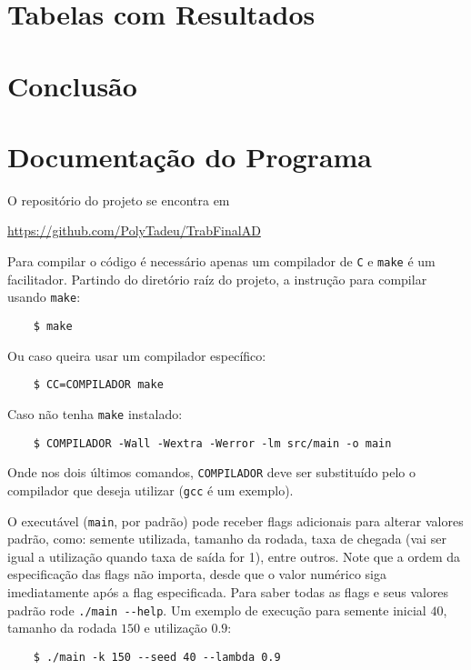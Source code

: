 \documentclass[a4paper]{article}
\newcommand{\inlcode}{\texttt}
\newcommand{\lang}{\texttt}
\begin{document}
\newpage
\section{Tabelas com Resultados}
\section{Conclusão}
\newpage
\section{Documentação do Programa}
O repositório do projeto se encontra em \par
\url{https://github.com/PolyTadeu/TrabFinalAD}

Para compilar o código é necessário apenas
um compilador de \lang{C}
e \inlcode{make} é um facilitador.
Partindo do diretório raíz do projeto,
a instrução para compilar usando \inlcode{make}:
\begin{verbatim}
    $ make
\end{verbatim}
Ou caso queira usar um compilador específico:
\begin{verbatim}
    $ CC=COMPILADOR make
\end{verbatim}
Caso não tenha \inlcode{make} instalado:
\begin{verbatim}
    $ COMPILADOR -Wall -Wextra -Werror -lm src/main -o main
\end{verbatim}
Onde nos dois últimos comandos,
\verb.COMPILADOR. deve ser substituído
pelo o compilador que deseja utilizar
(\inlcode{gcc} é um exemplo).

O executável (\inlcode{main}, por padrão)
pode receber flags adicionais para alterar valores padrão,
como: semente utilizada, tamanho da rodada,
taxa de chegada
(vai ser igual a utilização quando taxa de saída for 1),
entre outros.
Note que a ordem da especificação das flags não importa,
desde que o valor numérico siga imediatamente após
a flag especificada.
Para saber todas as flags e seus valores padrão
rode \inlcode{./main -{}-help}.
Um exemplo de execução para semente inicial \(40\),
tamanho da rodada \(150\) e utilização \(0.9\):
\begin{verbatim}
    $ ./main -k 150 --seed 40 --lambda 0.9
\end{verbatim}
\end{document}
